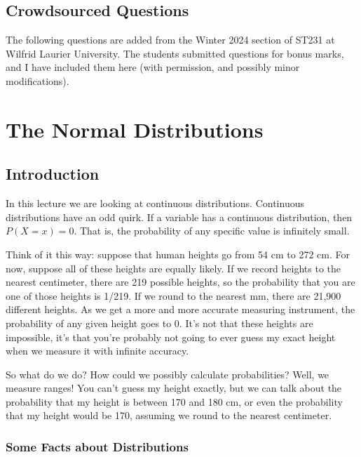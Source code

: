 \documentclass[
  letterpaper,
  DIV=11,
  numbers=noendperiod,
  oneside]{scrreprt}
\begin{document}
\hypertarget{crowdsourced-questions-3}{%
\section{Crowdsourced Questions}\label{crowdsourced-questions-3}}

The following questions are added from the Winter 2024 section of ST231
at Wilfrid Laurier University. The students submitted questions for
bonus marks, and I have included them here (with permission, and
possibly minor modifications).

\hypertarget{the-normal-distributions}{%
\chapter{The Normal Distributions}\label{the-normal-distributions}}

\hypertarget{introduction-4}{%
\section{Introduction}\label{introduction-4}}

In this lecture we are looking at continuous distributions. Continuous
distributions have an odd quirk. If a variable has a continuous
distribution, then \(P(X = x) = 0\). That is, the probability of any
specific value is infinitely small.

Think of it this way: suppose that human heights go from 54 cm to 272
cm. For now, suppose all of these heights are equally likely. If we
record heights to the nearest centimeter, there are 219 possible
heights, so the probability that you are one of those heights is 1/219.
If we round to the nearest mm, there are 21,900 different heights. As we
get a more and more accurate measuring instrument, the probability of
any given height goes to 0. It's not that these heights are impossible,
it's that you're probably not going to ever guess my exact height when
we measure it with infinite accuracy.

So what do we do? How could we possibly calculate probabilities? Well,
we measure ranges! You can't guess my height exactly, but we can talk
about the probability that my height is between 170 and 180 cm, or even
the probability that my height would be 170, assuming we round to the
nearest centimeter.

\hypertarget{some-facts-about-distributions}{%
\subsection{Some Facts about
Distributions}\label{some-facts-about-distributions}}
\end{document}
